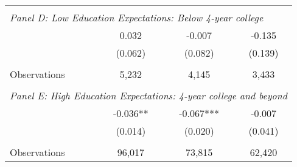 {\begin{tabular}{lccc}
&  &  &   \\
\multicolumn{4}{l}{\textit{Panel D: Low Education Expectations: Below 4-year college}} \\
\hspace{3mm}        &       0.032   &      -0.007   &      -0.135   \\
                    &     (0.062)   &     (0.082)   &     (0.139)   \\
                    &               &               &               \\
\hspace{3mm}Observations&       5,232   &       4,145   &       3,433   \\
 
&  &  &   \\
\multicolumn{4}{l}{\textit{Panel E: High Education Expectations: 4-year college and beyond}} \\
\hspace{3mm}        &      -0.036** &      -0.067***&      -0.007   \\
                    &     (0.014)   &     (0.020)   &     (0.041)   \\
                    &               &               &               \\
\hspace{3mm}Observations&      96,017   &      73,815   &      62,420   \\
 

\bottomrule
\end{tabular}
}
